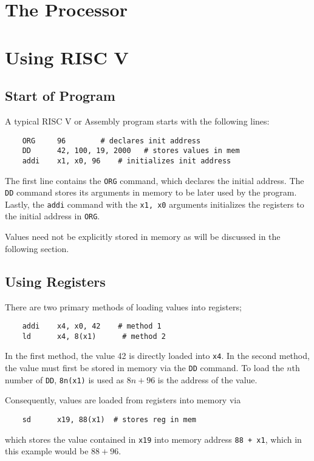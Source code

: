 \documentclass[oneside,11pt]{book}
\begin{document}
\chapter{The Processor}

\chapter{Using RISC V}

\section{Start of Program}

A typical RISC V or Assembly program starts with the following lines:
\begin{verbatim}
	ORG     96		  # declares init address
	DD      42, 100, 19, 2000   # stores values in mem
	addi    x1, x0, 96	  # initializes init address
\end{verbatim}
The first line contains the \verb$ORG$ command, which declares the initial address. The \verb$DD$ command stores its arguments in memory to be later used by the program. Lastly, the \verb$addi$ command with the \verb$x1, x0$ arguments initializes the registers to the initial address in \verb$ORG$.

\bigskip
Values need not be explicitly stored in memory as will be discussed in the following section.

\section{Using Registers}
There are two primary methods of loading values into registers;
\begin{verbatim}
	addi    x4, x0, 42	  # method 1
	ld      x4, 8(x1)	   # method 2
\end{verbatim}
In the first method, the value 42 is directly loaded into \verb|x4|. In the second method, the value must first be stored in memory via the \verb$DD$ command. To load the $n$th number of \verb$DD$, \verb$8n(x1)$ is used as $8n + 96$ is the address of the value.

\bigskip
Consequently, values are loaded from registers into memory via
\begin{verbatim}
	sd      x19, 88(x1)	 # stores reg in mem
\end{verbatim}
which stores the value contained in \verb$x19$ into memory address \verb|88 + x1|, which in this example would be $88 + 96$.
\end{document}
